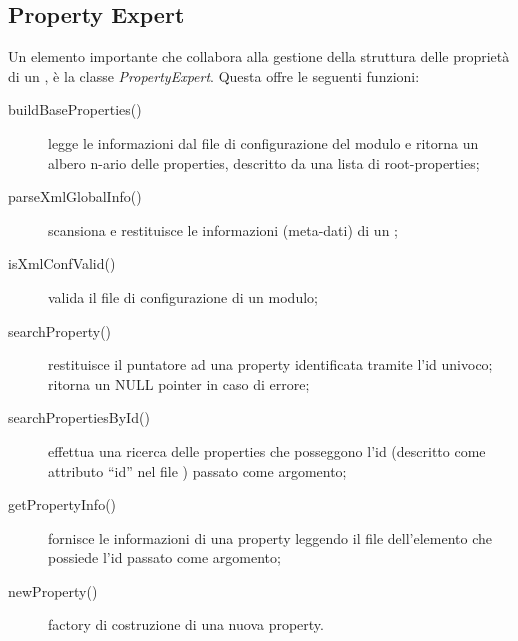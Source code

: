 \subsection*{Property Expert}
Un elemento importante che collabora alla gestione della struttura delle proprietà di un \plugin{}, è la classe \emph{PropertyExpert}. Questa offre le seguenti funzioni:
\begin{description}
\item[buildBaseProperties()] legge le informazioni dal file di configurazione del modulo e ritorna un albero n-ario delle properties, descritto da una lista di root-properties;

\item[parseXmlGlobalInfo()] scansiona e restituisce le informazioni (meta-dati) di un \plugin{};

\item[isXmlConfValid()] valida il file di configurazione di un modulo;

\item[searchProperty()] restituisce il puntatore ad una property identificata tramite l'id univoco; ritorna un NULL pointer in caso di errore;

\item[searchPropertiesById()] effettua una ricerca delle properties che posseggono l'id (descritto come attributo ``id'' nel file \xml{}) passato come argomento;

\item[getPropertyInfo()] fornisce le informazioni di una property leggendo il file \xml{} dell'elemento che possiede l'id passato come argomento;

\item[newProperty()] factory di costruzione di una nuova property.

\end{description}
